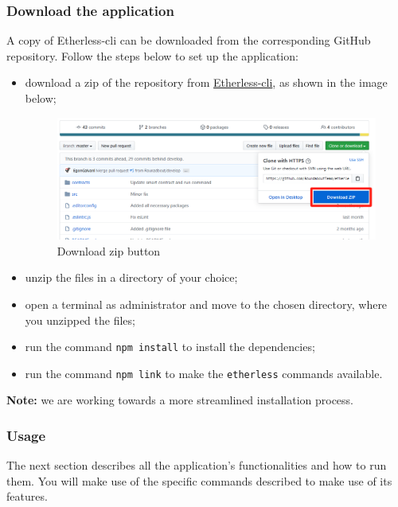     \subsubsection{Download the application}
      A copy of Etherless-cli can be downloaded from the corresponding GitHub repository. Follow the steps below to set up the application:
      \begin{itemize}
        \item download a zip of the repository from \href{https://github.com/RoundaboutTeam/etherless-cli/tree/master}{Etherless-cli}, as shown in the image below;
        \begin{figure}[H]
    			\centering
    			\includegraphics[width=1.1\textwidth]{./res/img/down_zip_repo.png}
    			\caption{Download zip button}
    		\end{figure}
        \item unzip the files in a directory of your choice;
        \item open a terminal as administrator and move to the chosen directory, where you unzipped the files;
        \item run the command \texttt{npm install} to install the dependencies;
        \item run the command \texttt{npm link} to make the \texttt{etherless} commands available.
      \end{itemize}
      \textbf{Note:} we are working towards a more streamlined installation process.
    \subsubsection{Usage}
      The next section describes all the application's functionalities and how to run them. You will make use of the specific commands described to make use of its features.
